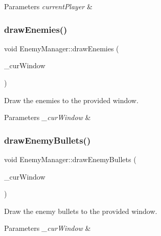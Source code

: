 \begin{DoxyParams}{Parameters}
{\em current\+Player} & \\
\hline
\end{DoxyParams}
\mbox{\label{class_enemy_manager_af740dd63780a06fde9a5dd72330624da}} 
\subsubsection{\texorpdfstring{draw\+Enemies()}{drawEnemies()}}
{\footnotesize\ttfamily void Enemy\+Manager\+::draw\+Enemies (\begin{DoxyParamCaption}\item[{sf\+::\+Render\+Window $\ast$}]{\+\_\+cur\+Window }\end{DoxyParamCaption})}



Draw the enemies to the provided window. 


\begin{DoxyParams}{Parameters}
{\em \+\_\+cur\+Window} & \\
\hline
\end{DoxyParams}
\mbox{\label{class_enemy_manager_ae551aa23d45b17e6c9b3d5b12e39ab26}} 
\subsubsection{\texorpdfstring{draw\+Enemy\+Bullets()}{drawEnemyBullets()}}
{\footnotesize\ttfamily void Enemy\+Manager\+::draw\+Enemy\+Bullets (\begin{DoxyParamCaption}\item[{sf\+::\+Render\+Window $\ast$}]{\+\_\+cur\+Window }\end{DoxyParamCaption})}



Draw the enemy bullets to the provided window. 


\begin{DoxyParams}{Parameters}
{\em \+\_\+cur\+Window} & \\
\hline
\end{DoxyParams}
\mbox{\label{class_enemy_manager_a4b6f8823d43203930ab98035fe808a55}} 
